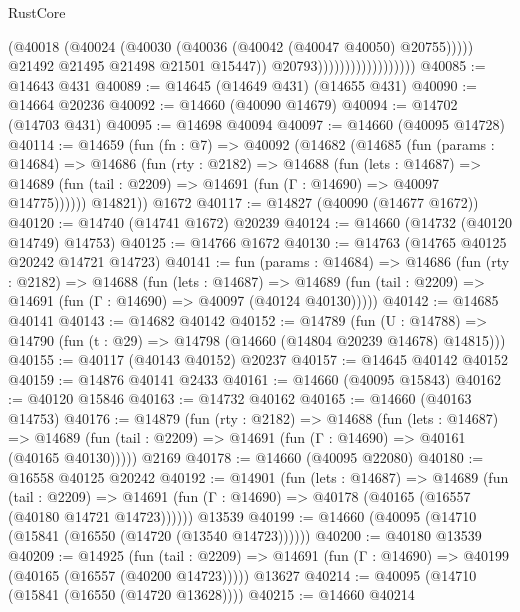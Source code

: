 \begin{lexlean}{RustCore}
\begin{coremodule}
                                            (@40018
                                              (@40024
                                                (@40030 (@40036 (@40042 (@40047 @40050) @20755)))))
                                            @21492
                                            @21495
                                            @21498
                                            @21501
                                            @15447))
                                        @20793))))))))))))))))))
@40085 := @14643 @431
@40089 := @14645 (@14649 @431) (@14655 @431)
@40090 := @14664 @20236
@40092 := @14660 (@40090 @14679)
@40094 := @14702 (@14703 @431)
@40095 := @14698 @40094
@40097 := @14660 (@40095 @14728)
@40114 := @14659
    (fun (fn : @7) =>
    @40092
      (@14682
        (@14685
          (fun (params : @14684) =>
          @14686
            (fun (rty : @2182) =>
            @14688
              (fun (lets : @14687) =>
              @14689 (fun (tail : @2209) => @14691 (fun (Γ : @14690) => @40097 @14775))))))
        @14821))
    @1672
@40117 := @14827 (@40090 (@14677 @1672))
@40120 := @14740 (@14741 @1672) @20239
@40124 := @14660 (@14732 (@40120 @14749) @14753)
@40125 := @14766 @1672
@40130 := @14763 (@14765 @40125 @20242 @14721 @14723)
@40141 := fun (params : @14684) =>
  @14686
    (fun (rty : @2182) =>
    @14688
      (fun (lets : @14687) =>
      @14689 (fun (tail : @2209) => @14691 (fun (Γ : @14690) => @40097 (@40124 @40130)))))
@40142 := @14685 @40141
@40143 := @14682 @40142
@40152 := @14789
    (fun (U : @14788) => @14790 (fun (t : @29) => @14798 (@14660 (@14804 @20239 @14678) @14815)))
@40155 := @40117 (@40143 @40152) @20237
@40157 := @14645 @40142 @40152
@40159 := @14876 @40141 @2433
@40161 := @14660 (@40095 @15843)
@40162 := @40120 @15846
@40163 := @14732 @40162
@40165 := @14660 (@40163 @14753)
@40176 := @14879
    (fun (rty : @2182) =>
    @14688
      (fun (lets : @14687) =>
      @14689 (fun (tail : @2209) => @14691 (fun (Γ : @14690) => @40161 (@40165 @40130)))))
    @2169
@40178 := @14660 (@40095 @22080)
@40180 := @16558 @40125 @20242
@40192 := @14901
    (fun (lets : @14687) =>
    @14689
      (fun (tail : @2209) =>
      @14691 (fun (Γ : @14690) => @40178 (@40165 (@16557 (@40180 @14721 @14723))))))
    @13539
@40199 := @14660 (@40095 (@14710 (@15841 (@16550 (@14720 (@13540 @14723))))))
@40200 := @40180 @13539
@40209 := @14925
    (fun (tail : @2209) => @14691 (fun (Γ : @14690) => @40199 (@40165 (@16557 (@40200 @14723)))))
    @13627
@40214 := @40095 (@14710 (@15841 (@16550 (@14720 @13628))))
@40215 := @14660 @40214

\end{coremodule}
\end{lexlean}
